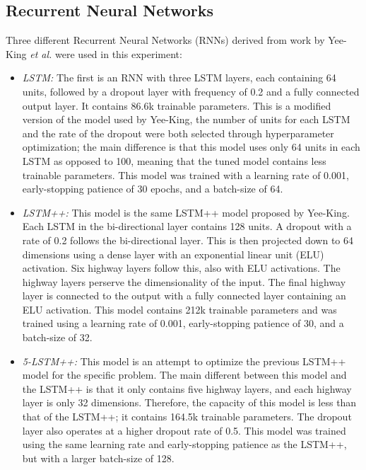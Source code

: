 \subsection{Recurrent Neural Networks}
Three different Recurrent Neural Networks (RNNs) derived from work by Yee-King \textit{et al.} \cite{yee2018automatic} were used in this experiment:
\begin{itemize}
    \item \textit{LSTM:} The first is an RNN with three LSTM layers, each containing 64 units, followed by a dropout layer with frequency of 0.2 and a fully connected output layer. It contains 86.6k trainable parameters. This is a modified version of the model used by Yee-King, the number of units for each LSTM and the rate of the dropout were both selected through hyperparameter optimization; the main difference is that this model uses only 64 units in each LSTM as opposed to 100, meaning that the tuned model contains less trainable parameters. This model was trained with a learning rate of 0.001, early-stopping patience of 30 epochs, and a batch-size of 64.
    \item \textit{LSTM++:} This model is the same LSTM++ model proposed by Yee-King. Each LSTM in the bi-directional layer contains 128 units. A dropout with a rate of 0.2 follows the bi-directional layer. This is then projected down to 64 dimensions using a dense layer with an exponential linear unit (ELU) activation. Six highway layers follow this, also with ELU activations. The highway layers perserve the dimensionality of the input. The final highway layer is connected to the output with a fully connected layer containing an ELU activation. This model contains 212k trainable parameters and was trained using a learning rate of 0.001, early-stopping patience of 30, and a batch-size of 32.
    \item \textit{5-LSTM++:} This model is an attempt to optimize the previous LSTM++ model for the specific problem. The main different between this model and the LSTM++ is that it only contains five highway layers, and each highway layer is only 32 dimensions. Therefore, the capacity of this model is less than that of the LSTM++; it contains 164.5k trainable parameters. The dropout layer also operates at a higher dropout rate of 0.5. This model was trained using the same learning rate and early-stopping patience as the LSTM++, but with a larger batch-size of 128.
\end{itemize}

